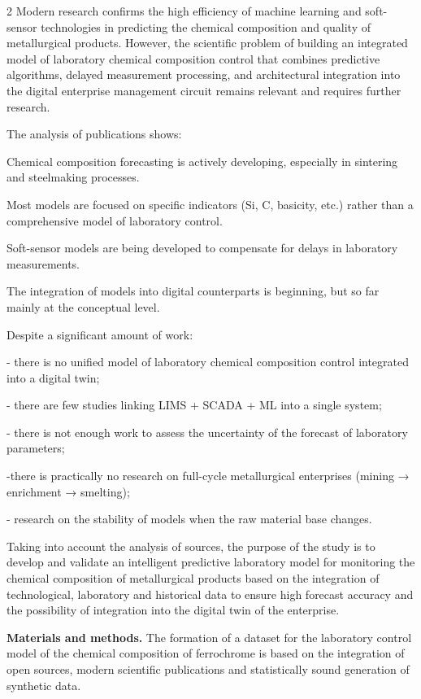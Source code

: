 \begin{multicols}{2}
Modern research confirms the high efficiency of machine learning and
soft-sensor technologies in predicting the chemical composition and
quality of metallurgical products. However, the scientific problem of
building an integrated model of laboratory chemical composition control
that combines predictive algorithms, delayed measurement processing, and
architectural integration into the digital enterprise management circuit
remains relevant and requires further research.

The analysis of publications shows:

Chemical composition forecasting is actively developing, especially in
sintering and steelmaking processes.

Most models are focused on specific indicators (Si, C, basicity, etc.)
rather than a comprehensive model of laboratory control.

Soft-sensor models are being developed to compensate for delays in
laboratory measurements.

The integration of models into digital counterparts is beginning, but so
far mainly at the conceptual level.

Despite a significant amount of work:

- there is no unified model of laboratory chemical composition control
integrated into a digital twin;

- there are few studies linking LIMS + SCADA + ML into a single system;

- there is not enough work to assess the uncertainty of the forecast of
laboratory parameters;

-there is practically no research on full-cycle metallurgical
enterprises (mining → enrichment → smelting);

- research on the stability of models when the raw material base
changes.

Taking into account the analysis of sources, the purpose of the study is
to develop and validate an intelligent predictive laboratory model for
monitoring the chemical composition of metallurgical products based on
the integration of technological, laboratory and historical data to
ensure high forecast accuracy and the possibility of integration into
the digital twin of the enterprise.

{\bfseries Materials and methods.} The formation of a dataset for the
laboratory control model of the chemical composition of ferrochrome is
based on the integration of open sources, modern scientific publications
and statistically sound generation of synthetic data.


\end{multicols}
